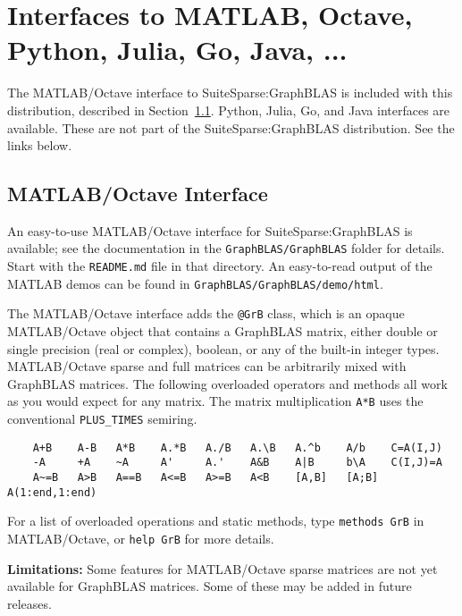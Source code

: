\documentclass[12pt]{article}
\begin{document}
\section{Interfaces to MATLAB, Octave, Python, Julia, Go, Java, ...} %

The MATLAB/Octave interface to SuiteSparse:GraphBLAS is included with this
distribution, described in Section~\ref{octave}.
Python, Julia, Go, and Java interfaces are available.
These are not part of the SuiteSparse:GraphBLAS distribution.
See the links below.

\subsection{MATLAB/Octave Interface}
\label{octave}

An easy-to-use MATLAB/Octave interface for SuiteSparse:GraphBLAS is available;
see the documentation in the \verb'GraphBLAS/GraphBLAS' folder for details.
Start with the \verb'README.md' file in that directory.  An easy-to-read output
of the MATLAB demos can be found in \verb'GraphBLAS/GraphBLAS/demo/html'.

The MATLAB/Octave interface adds the \verb'@GrB' class, which is an opaque
MATLAB/Octave object that contains a GraphBLAS matrix, either double or single
precision (real or complex), boolean, or any of the built-in integer types.
MATLAB/Octave sparse and full matrices can be arbitrarily mixed with GraphBLAS
matrices.  The following overloaded operators and methods all work as you would
expect for any matrix.  The matrix multiplication \verb'A*B' uses the
conventional \verb'PLUS_TIMES' semiring.

{\footnotesize
\begin{verbatim}
    A+B    A-B   A*B    A.*B   A./B   A.\B   A.^b    A/b    C=A(I,J)
    -A     +A    ~A     A'     A.'    A&B    A|B     b\A    C(I,J)=A
    A~=B   A>B   A==B   A<=B   A>=B   A<B    [A,B]   [A;B]  A(1:end,1:end) \end{verbatim}}

For a list of overloaded operations and static methods, type
\verb'methods GrB' in MATLAB/Octave, or \verb'help GrB' for more details.

{\bf Limitations:}
Some features for MATLAB/Octave sparse matrices are not yet available for
GraphBLAS matrices.  Some of these may be added in future releases.
\end{document}
